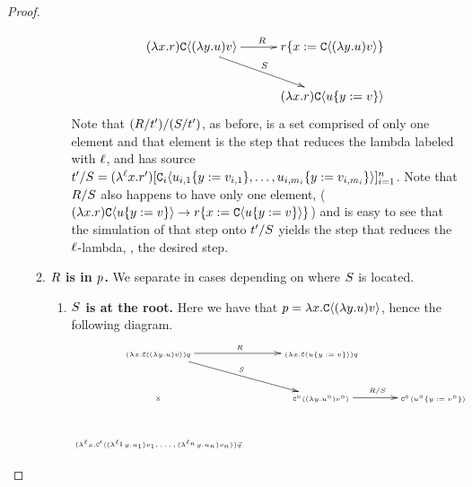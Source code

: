 \begin{proof}
\begin{enumerate}
\begin{enumerate}
\begin{enumerate}
\[            \xymatrix@C=1cm{
              (\lam{\var}{\tmfour}) \conof{(\lam{\vartwo}{\tmthree}) \tmthreevariant}
                \ar@{->}[r]^{\redex} \ar@{->}[rd]^{\redextwo}
                  & \subs{\tmfour}{\var}{\conof{(\lam{\vartwo}{\tmthree}) \tmthreevariant}} \\
                & (\lam{\var}{\tmfour}) \conof{\subs{\tmthree}{\vartwo}{\tmthreevariant}} \\
            }
            \]
            Note that $(R / t') / (S / t')$, as before, is a set comprised of only one element
            and that element is the step that reduces the lambda labeled with $\ell$, and has source
            $t' / S = (\lambda^{\ell} x. r')[
              \mathtt{C}_i\langle u_{i,1}\{y := v_{i,1}\}, \hdots, u_{i,m_i}\{y := v_{i,m_i}\}\rangle]_{i=1}^n$.
            Note that $R / S$ also happens to have only one element,
            ($(\lambda x. r) \mathtt{C}\langle u\{y := v\}\rangle \to
              r\{x := \mathtt{C}\langle u\{y := v\}\rangle\}$)
            and is easy to see that the simulation of that step onto
            $t' / S$
            yields the step that reduces the $\ell$-lambda, \ie, the desired step.
        \end{enumerate}
      \item {\bf $R$ is in $p$.} We separate in cases depending on where $S$ is located.
        \begin{enumerate}
          \item {\bf $S$ is at the root.}
            Here we have that $p = \lambda x. \mathtt{C}\langle(\lambda y. u) v\rangle$, hence
            the following diagram.
            \[
            {\tiny
            \xymatrix@C=1cm{
              (\lam{\var}{\conof{(\lam{\vartwo}{\tmthree}) \tmthreevariant}}) \tmsix
                \ar@{->}[r]^{\redex} \ar@{->}[rd]^{\redextwo} \ar@{}[dd]|*=0[@]{\rtimes}
                  & (\lam{\var}{\conof{\subs{\tmthree}{\vartwo}{\tmthreevariant}}}) \tmsix & \\
                & \con^{\circ}\of{(\lam{\vartwo}{\tmthree^{\circ}}) \tmthreevariant^{\circ}}
                  \ar@{->}[r]^{\redex / \redextwo}
                  & \con^{\circ}\of{\subs{\tmthree^{\circ}}{\vartwo}{\tmthreevariant^{\circ}}} \\
              (\lamp{\lab}{\var}{\con'\of{(\lamp{\lab_1}{\vartwo}{\tmthree_1}) \tmthreevariant_1, \hdots, (\lamp{\lab_n}{\vartwo}{\tmthree_n}) \tmthreevariant_n}}) \ls{\tmsix}
}}\]
\end{enumerate}
\end{enumerate}
\end{enumerate}
\end{proof}
